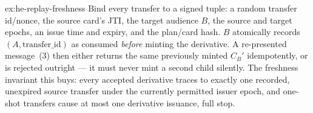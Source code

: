 \documentclass[11pt,a4paper]{article}
\theoremstyle{definition}
\theoremstyle{definition}
\theoremstyle{remark}
\begin{document}
\begin{pdsolution}{ex:he-replay-freshness}
Bind every transfer to a signed tuple: a random transfer id/nonce, the
source card's JTI, the target audience $B$, the source and target epochs, an
issue time and expiry, and the plan/card hash. $B$ atomically records
$(A,\text{transfer\_id})$ as consumed \emph{before} minting the derivative. A
re-presented message~(3) then either returns the same previously minted $C_B'$
idempotently, or is rejected outright --- it must never mint a second child
silently. The freshness invariant this buys: every accepted derivative traces to
exactly one recorded, unexpired source transfer under the currently permitted
issuer epoch, and one-shot transfers cause at most one derivative issuance, full
stop.
\end{pdsolution}

\end{document}
